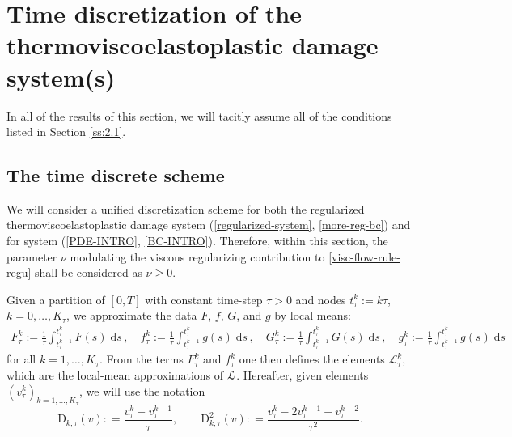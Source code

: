 \documentclass[a4paper,10pt,reqno]{amsart}
\numberwithin{equation}{section}
\numberwithin{equation}{section}
\def\dd{\;\!\mathrm{d}} %
\newcommand{\Ftau}[1]{F_\tau^{#1}}
\newcommand{\Ltau}[1]{\mathcal{L}_\tau^{#1}}
\newcommand{\Gtau}[1]{G_\tau^{#1}}
\newcommand{\gtau}[1]{g_\tau^{#1}}
\newcommand{\ftau}[1]{f_\tau^{#1}}
\newcommand{\vtau}[1]{v_\tau^{#1}}
\newcommand{\Dtau}[2]{\mathrm{D}_{#1,\tau}(#2)}
\newcommand{\Ddtau}[2]{\mathrm{D}_{#1,\tau}^2(#2)}
\newcommand{\EEE}{\color{black}}
\begin{document}
\section{\bf Time discretization of the thermoviscoelastoplastic damage system(s)}
\label{s:3}
\noindent 
In all of the results of  this section, we will tacitly assume all of the conditions listed in Section \ref{ss:2.1}.
\subsection{The time discrete scheme}
\label{ss:3.1}
We will  consider a unified   discretization scheme for both the regularized  thermoviscoelastoplastic damage system 
(\ref{regularized-system}, \ref{more-reg-bc})
and for system (\ref{PDE-INTRO}, \ref{BC-INTRO}).
Therefore, within this section, the parameter $\nu$ 
modulating the viscous regularizing contribution to \eqref{visc-flow-rule-regu} shall be considered as \underline{$\nu\geq 0$}.
\par
Given
a partition of $[0,T]$ with constant time-step $\tau>0$ and
nodes $t_\tau^k:=k\tau$, $k=0,\ldots,K_\tau$,  we
approximate the data  $F$, $f$,  $G$, and $g$ 
 by local means:
\begin{equation}
\label{local-means} 
\begin{gathered}
\Ftau{k}:= 
\frac{1}{\tau}\int_{t_\tau^{k-1}}^{t_\tau^k}  F(s)\dd s\,,
\quad 
\ftau{k}:= 
\frac{1}{\tau}\int_{t_\tau^{k-1}}^{t_\tau^k}  g(s)\dd s\,,
\quad
 \Gtau{k}:= \frac{1}{\tau}\int_{t_\tau^{k-1}}^{t_\tau^k} G(s)
\dd s\,, \quad \gtau{k}:= \frac{1}{\tau}\int_{t_\tau^{k-1}}^{t_\tau^k} g(s)
\dd s
\end{gathered}
\end{equation}
for all $k=1,\ldots, K_\tau$.  From the terms $\Ftau{k}$ and $\ftau{k}$ one then defines the elements $ \Ltau{k}$, which are the local-mean approximations of ${\mathcal L}$. 
Hereafter, given elements $(v_{\tau}^k)_{k=1,\ldots, K_\tau}$, %
we will use the notation
\begin{equation}
\label{discrete-notation}
\Dtau{k} v: = \frac{v_{\tau}^{k} - v_{\tau}^{k-1}}\tau, \qquad  \Ddtau{k} v: = \frac{\vtau{k} -2 \vtau{k-1} + \vtau{k-2}}{\tau^2}.
\end{equation}
\end{document}
